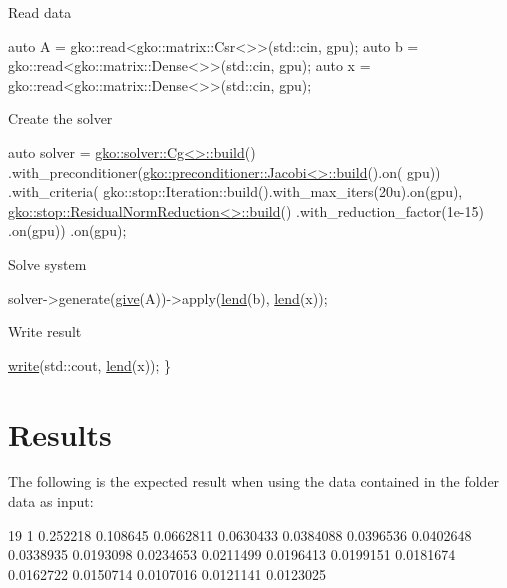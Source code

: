Read data


\begin{DoxyCode}
\textcolor{keyword}{auto} A = gko::read<gko::matrix::Csr<>>(std::cin, gpu);
\textcolor{keyword}{auto} b = gko::read<gko::matrix::Dense<>>(std::cin, gpu);
\textcolor{keyword}{auto} x = gko::read<gko::matrix::Dense<>>(std::cin, gpu);
\end{DoxyCode}


Create the solver


\begin{DoxyCode}
\textcolor{keyword}{auto} solver =
    \hyperlink{classgko_1_1solver_1_1Cg}{gko::solver::Cg<>::build}()
        .with\_preconditioner(\hyperlink{classgko_1_1preconditioner_1_1Jacobi}{gko::preconditioner::Jacobi<>::build}().on(
      gpu))
        .with\_criteria(
            gko::stop::Iteration::build().with\_max\_iters(20u).on(gpu),
            \hyperlink{classgko_1_1stop_1_1ResidualNormReduction}{gko::stop::ResidualNormReduction<>::build}()
                .with\_reduction\_factor(1e-15)
                .on(gpu))
        .on(gpu);
\end{DoxyCode}


Solve system


\begin{DoxyCode}
solver->generate(\hyperlink{namespacegko_acbd3fd6d07e498892881e8e2ab0b4167}{give}(A))->apply(\hyperlink{namespacegko_aa8cb4876b72e5e1036ea9575443c439b}{lend}(b), \hyperlink{namespacegko_aa8cb4876b72e5e1036ea9575443c439b}{lend}(x));
\end{DoxyCode}


Write result


\begin{DoxyCode}
    \hyperlink{namespacegko_a859dc47a462721d83728d91ab7fa2148}{write}(std::cout, \hyperlink{namespacegko_aa8cb4876b72e5e1036ea9575443c439b}{lend}(x));
\}
\end{DoxyCode}
 \label{_Results}%
\section*{Results}

The following is the expected result when using the data contained in the folder {\ttfamily data} as input\+:


\begin{DoxyCode}
19 1
0.252218
0.108645
0.0662811
0.0630433
0.0384088
0.0396536
0.0402648
0.0338935
0.0193098
0.0234653
0.0211499
0.0196413
0.0199151
0.0181674
0.0162722
0.0150714
0.0107016
0.0121141
0.0123025
\end{DoxyCode}


